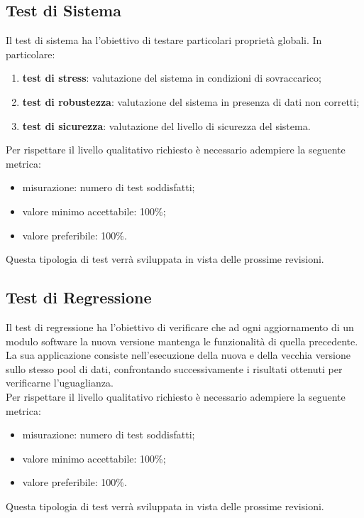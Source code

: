 \subsection{Test di Sistema}
Il test di sistema ha l'obiettivo di testare particolari proprietà globali. In particolare:
\begin{enumerate}
	\item{\textbf{test di stress}: valutazione del sistema in condizioni di sovraccarico;}
	\item{\textbf{test di robustezza}: valutazione del sistema in presenza di dati non corretti;}
	\item{\textbf{test di sicurezza}: valutazione del livello di sicurezza del sistema.}
\end{enumerate}
Per rispettare il livello qualitativo richiesto è necessario adempiere la seguente metrica:
\begin{itemize}
	\item{misurazione: numero di test soddisfatti;}
	\item{valore minimo accettabile: 100\%;}
	\item{valore preferibile: 100\%.}
\end{itemize}
Questa tipologia di test verrà sviluppata in vista delle prossime revisioni.


\subsection{Test di Regressione}
Il test di regressione ha l'obiettivo di verificare che ad ogni aggiornamento di un modulo software la nuova versione mantenga le funzionalità di quella precedente.
La sua applicazione consiste nell'esecuzione della nuova e della vecchia versione sullo stesso pool di dati, confrontando successivamente i risultati ottenuti per verificarne l'uguaglianza.\\
Per rispettare il livello qualitativo richiesto è necessario adempiere la seguente metrica:
\begin{itemize}
	\item misurazione: numero di test soddisfatti;
	\item valore minimo accettabile: 100\%;
	\item valore preferibile: 100\%.
\end{itemize}
Questa tipologia di test verrà sviluppata in vista delle prossime revisioni.